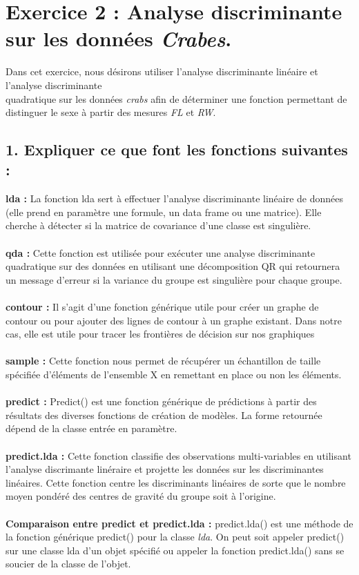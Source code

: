 \documentclass[a4paper, 10pt]{article}
\begin{document}
\newpage
\section*{Exercice 2 : Analyse discriminante sur les données \textit{Crabes}.}
Dans cet exercice, nous désirons utiliser l'analyse discriminante linéaire et l'analyse discriminante\\quadratique sur les données \textit{crabs}
afin de déterminer une fonction permettant de distinguer le sexe à partir des mesures \textit{FL} et \textit{RW}.\\

\subsection*{1. Expliquer ce que font les fonctions suivantes :}
\textbf{lda :} La fonction lda sert à effectuer l'analyse discriminante linéaire de données
(elle prend en paramètre une formule, un data frame ou une matrice).
Elle cherche à détecter si la matrice de covariance d'une classe est singulière.\\ \\
\textbf{qda :} Cette fonction est utilisée pour exécuter une analyse discriminante quadratique sur des données
en utilisant une décomposition QR qui retournera un message d'erreur si la variance du groupe est singulière pour chaque groupe.\\ \\
\textbf{contour :} Il s'agit d'une fonction générique utile pour créer un graphe de contour ou
pour ajouter des lignes de contour à un graphe existant.
Dans notre cas, elle est utile pour tracer les frontières de décision sur nos graphiques\\ \\
\textbf{sample :} Cette fonction nous permet de récupérer un échantillon de taille spécifiée d'éléments de l'ensemble X
en remettant en place ou non les éléments.\\ \\
\textbf{predict :} Predict() est une fonction générique de prédictions à partir des résultats des diverses fonctions de création de modèles.
La forme retournée dépend de la classe entrée en paramètre.\\ \\
\textbf{predict.lda :} Cette fonction classifie des observations multi-variables en utilisant l'analyse discrimante linéraire et
projette les données sur les discriminantes linéaires.
Cette fonction centre les discriminants linéaires de sorte que le nombre moyen pondéré des centres de gravité du groupe soit à l'origine.\\ \\
\textbf{Comparaison entre predict et predict.lda :} predict.lda() est une méthode de la fonction générique predict() pour la classe \textit{lda}.
On peut soit appeler predict() sur une classe lda d'un objet spécifié ou
appeler la fonction predict.lda() sans se soucier de la classe de l'objet.\\ \\
\end{document}
